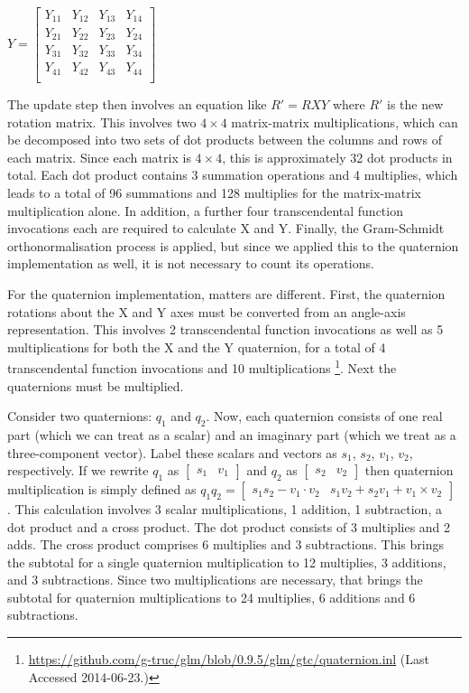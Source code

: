 \documentclass{acm_proc_article-sp}
\begin{document}
$Y = \left[ \begin{array}{cccc}
    Y_{11} & Y_{12} & Y_{13} & Y_{14} \\
    Y_{21} & Y_{22} & Y_{23} & Y_{24} \\
    Y_{31} & Y_{32} & Y_{33} & Y_{34} \\
    Y_{41} & Y_{42} & Y_{43} & Y_{44} \\
\end{array} \right]$

The update step then involves an equation like $R\prime = RXY$ where $R\prime$ is the new rotation matrix.
This involves two $4 \times 4$ matrix-matrix multiplications, which can be decomposed into two sets of dot products between the columns and rows of each matrix.
Since each matrix is $4 \times 4$, this is approximately 32 dot products in total.
Each dot product contains 3 summation operations and 4 multiplies, which leads to a total of 96 summations and 128 multiplies for the matrix-matrix multiplication alone.
In addition, a further four transcendental function invocations each are required to calculate X and Y.
Finally, the Gram-Schmidt orthonormalisation process is applied, but since we applied this to the quaternion implementation as well, it is not necessary to count its operations.

For the quaternion implementation, matters are different.
First, the quaternion rotations about the X and Y axes must be converted from an angle-axis representation.
This involves 2 transcendental function invocations as well as 5 multiplications for both the X and the Y quaternion, for a total of 4 transcendental function invocations and 10 multiplications \footnote{\url{https://github.com/g-truc/glm/blob/0.9.5/glm/gtc/quaternion.inl} (Last Accessed 2014-06-23.)}.
Next the quaternions must be multiplied.

Consider two quaternions: $q_1$ and $q_2$.
Now, each quaternion consists of one real part (which we can treat as a scalar) and an imaginary part (which we treat as a three-component vector).
Label these scalars and vectors as $s_1$, $s_2$, $v_1$, $v_2$, respectively.
If we rewrite $q_1$ as $\left[ \begin{array}{cc} s_1 & v_1 \end{array} \right]$ and $q_2$ as $\left[ \begin{array}{cc} s_2 & v_2 \end{array} \right]$ then quaternion multiplication is simply defined as $q_1 q_2 = \left[ \begin{array}{cc} s_1 s_2 - v_1 \cdot v_2 & s_1 v_2 + s_2 v_1 + v_1 \times v_2 \end{array} \right]$ \cite{schoemake85}.
This calculation involves 3 scalar multiplications, 1 addition, 1 subtraction, a dot product and a cross product.
The dot product consists of 3 multiplies and 2 adds.
The cross product comprises 6 multiplies and 3 subtractions.
This brings the subtotal for a single quaternion multiplication to 12 multiplies, 3 additions, and 3 subtractions.
Since two multiplications are necessary, that brings the subtotal for quaternion multiplications to 24 multiplies, 6 additions and 6 subtractions.
\end{document}
